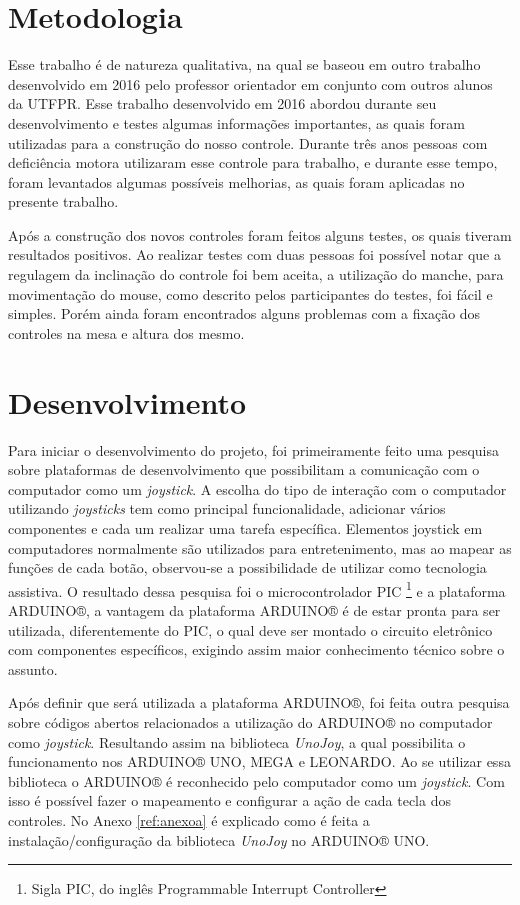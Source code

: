 \documentclass[
	12pt,			%
	openright,		%
	oneside,			%
	a4paper,			%
	chapter=TITLE,		%
	english,			%
	brazil,			%
	]{abntex2}
\begin{document}
\chapter{Metodologia}
\label{met}

Esse trabalho é de natureza qualitativa, na qual se baseou em outro trabalho desenvolvido em 2016 pelo professor orientador em conjunto com outros alunos da UTFPR. Esse trabalho desenvolvido em 2016 abordou durante seu desenvolvimento e testes algumas informações importantes, as quais foram utilizadas para a construção do nosso controle. Durante três anos pessoas com deficiência motora utilizaram esse controle para trabalho, e durante esse tempo, foram levantados algumas possíveis melhorias, as quais foram aplicadas no presente trabalho.

Após a construção dos novos controles foram feitos alguns testes, os quais tiveram resultados positivos. Ao realizar testes com duas pessoas foi possível notar que a regulagem da inclinação do controle foi bem aceita, a utilização do manche, para movimentação do mouse, como descrito pelos participantes do testes, foi fácil e simples. Porém ainda foram encontrados alguns problemas com a fixação dos controles na mesa e altura dos mesmo.

\chapter{Desenvolvimento}
\label{des}

Para iniciar o desenvolvimento do projeto, foi primeiramente feito uma pesquisa sobre plataformas de desenvolvimento que possibilitam a comunicação com o computador como um \emph{joystick}. A escolha do tipo de interação com o computador utilizando \emph{joysticks} tem como principal funcionalidade, adicionar vários componentes e cada um realizar uma tarefa específica. Elementos joystick em computadores normalmente são utilizados para entretenimento, mas ao mapear as funções de cada botão, observou-se a possibilidade de utilizar como tecnologia assistiva. O resultado dessa pesquisa foi o microcontrolador PIC \footnote{Sigla PIC, do inglês Programmable Interrupt Controller} e a plataforma ARDUINO®, a vantagem da plataforma ARDUINO® é de estar pronta para ser utilizada, diferentemente do PIC, o qual deve ser montado o circuito eletrônico com componentes específicos, exigindo assim maior conhecimento técnico sobre o assunto.

Após definir que será utilizada a plataforma ARDUINO®, foi feita outra pesquisa sobre códigos abertos relacionados a utilização do ARDUINO® no computador como \emph{joystick}. Resultando assim na biblioteca \emph{UnoJoy}, a qual possibilita o funcionamento nos ARDUINO® UNO, MEGA e LEONARDO. Ao se utilizar essa biblioteca o ARDUINO® é reconhecido pelo computador como um \emph{joystick}. Com isso é possível fazer o mapeamento e configurar a ação de cada tecla dos controles. No Anexo \ref{ref:anexoa} é explicado como é feita a instalação/configuração da biblioteca \emph{UnoJoy} no ARDUINO® UNO.
\end{document}
